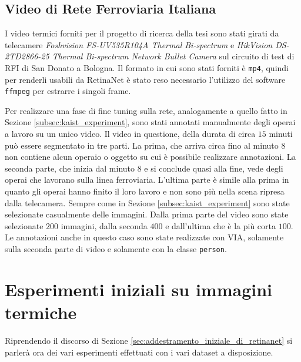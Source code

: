 \subsection{Video di Rete Ferroviaria Italiana}
\label{subsec:rfi_video_experiment}
I video termici forniti per il progetto di ricerca della tesi sono stati girati da telecamere \textit{Foshvision FS-UV535R104A Thermal Bi-spectrum} e \textit{HikVision DS-2TD2866-25 Thermal Bi-spectrum Network Bullet Camera} sul circuito di test di \ac{RFI} di San Donato a Bologna.
Il formato in cui sono stati forniti è \texttt{mp4}, quindi per renderli usabili da RetinaNet è stato reso necessario l'utilizzo del software \texttt{ffmpeg} per estrarre i singoli frame. 

Per realizzare una fase di fine tuning sulla rete, analogamente a quello fatto in Sezione \ref{subsec:kaist_experiment}, sono stati annotati manualmente degli operai a lavoro su un unico video.
Il video in questione, della durata di circa $15$ minuti può essere segmentato in tre parti. La prima, che arriva circa fino al minuto $8$ non contiene alcun operaio o oggetto su cui è possibile realizzare annotazioni. La seconda parte, che inizia dal minuto 8 e si conclude quasi alla fine, vede degli operai che lavorano sulla linea ferroviaria. L'ultima parte è simile alla prima in quanto gli operai hanno finito il loro lavoro e non sono più nella scena ripresa dalla telecamera. 
Sempre come in Sezione \ref{subsec:kaist_experiment} sono state selezionate casualmente delle immagini. Dalla prima parte del video sono state selezionate $200$ immagini, dalla seconda $400$ e dall'ultima che è la più corta $100$. Le annotazioni anche in questo caso sono state realizzate con \ac{VIA}, solamente sulla seconda parte di video e solamente con la classe \texttt{person}.
 

\section{Esperimenti iniziali su immagini termiche}
\label{sec:init_experiment_thermal}
Riprendendo il discorso di Sezione \ref{sec:addestramento_iniziale_di_retinanet} si parlerà ora dei vari esperimenti effettuati con i vari dataset a disposizione. 




